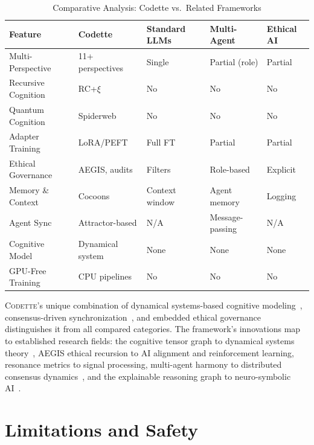 \documentclass[11pt,a4paper]{article}
\newcommand{\rcxi}{RC+$\xi$}
\newcommand{\codette}{\textsc{Codette}}
\begin{document}
\begin{table}[H]
\centering
\caption{Comparative Analysis: Codette vs.\ Related Frameworks}
\label{tab:comparative}
\begin{tabular}{@{}lp{2.2cm}p{2cm}p{2cm}p{2cm}@{}}
\toprule
\textbf{Feature} & \textbf{Codette} & \textbf{Standard LLMs} & \textbf{Multi-Agent} & \textbf{Ethical AI} \\
\midrule
Multi-Perspective   & 11+ perspectives & Single        & Partial (role) & Partial \\
Recursive Cognition & \rcxi{}          & No            & No             & No \\
Quantum Cognition   & Spiderweb        & No            & No             & No \\
Adapter Training    & LoRA/PEFT        & Full FT       & Partial        & Partial \\
Ethical Governance   & AEGIS, audits   & Filters       & Role-based     & Explicit \\
Memory \& Context   & Cocoons          & Context window & Agent memory  & Logging \\
Agent Sync          & Attractor-based  & N/A           & Message-passing & N/A \\
Cognitive Model     & Dynamical system & None          & None           & None \\
GPU-Free Training   & CPU pipelines    & No            & No             & No \\
\bottomrule
\end{tabular}
\end{table}

\codette{}'s unique combination of dynamical systems-based cognitive modeling~\citep{strogatz2015nonlinear,beer2000dynamical}, consensus-driven synchronization~\citep{olfatisaber2007consensus}, and embedded ethical governance distinguishes it from all compared categories. The framework's innovations map to established research fields: the cognitive tensor graph to dynamical systems theory~\citep{khalil2002nonlinear}, AEGIS ethical recursion to AI alignment and reinforcement learning, resonance metrics to signal processing, multi-agent harmony to distributed consensus dynamics~\citep{ren2005consensus,kuramoto1984chemical}, and the explainable reasoning graph to neuro-symbolic AI~\citep{garcez2019neural}.

\section{Limitations and Safety}
\label{sec:limitations}
\end{document}

